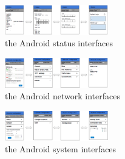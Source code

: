 	\begin{figure}
		\centering
		\includegraphics[width=0.4\textwidth]{UIstatus.png}
		\caption{the Android status interfaces}
		\label{OpenWRT:androidstatus}
	\end{figure}
	
	\begin{figure}
		\centering
		\includegraphics[width=0.4\textwidth]{UInetwork.png}
		\caption{the Android network interfaces}
		\label{OpenWRT:androidnetwork}
	\end{figure}
	\begin{figure}
		\centering
		\includegraphics[width=0.4\textwidth]{UIsystem.png}
		\caption{the Android system interfaces}
		\label{OpenWRT:androidsystem}
	\end{figure}
	

